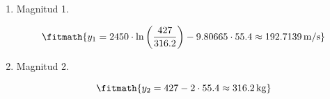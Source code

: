 \begin{enumerate}

\item Magnitud 1.

\[\fitmath{y_{1}=2450\cdot \ln\left(\frac{427}{316.2}\right)-9.80665\cdot 55.4\approx 192.7139\,\mathrm{m/s}}\]

\item Magnitud 2.

\[\fitmath{y_{2}=427-2\cdot 55.4\approx 316.2\,\mathrm{kg}}\]

\end{enumerate}
